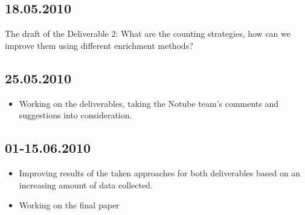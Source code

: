 \documentclass{article}
\begin{document}
\subsection{18.05.2010}
The draft of the Deliverable 2:
What are the counting strategies, how can we improve them using different
enrichment methods?


\subsection{25.05.2010}
\begin{itemize}
\item{Working on the deliverables, taking the Notube team's comments and suggestions
into consideration.}
\end{itemize}


\subsection{01-15.06.2010}
\begin{itemize}
\item{Improving results of the taken approaches for both deliverables based on an
increasing amount of data collected.}
\item{Working on the final paper}
\end{itemize}
\end{document}
